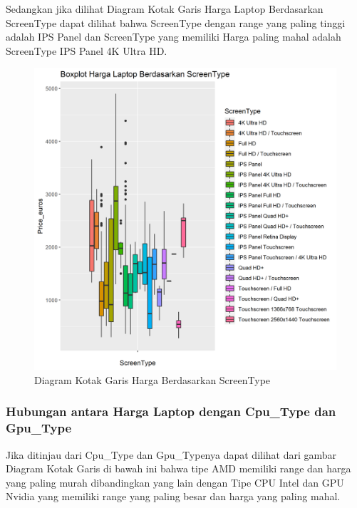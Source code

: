 \documentclass[12pt]{article}
\begin{document}
Sedangkan jika dilihat Diagram Kotak Garis Harga Laptop Berdasarkan ScreenType dapat dilihat bahwa ScreenType dengan range yang paling tinggi adalah IPS Panel dan ScreenType yang memiliki Harga paling mahal adalah ScreenType IPS Panel 4K Ultra HD.  
  
\begin{figure}[h!]
    \centering
    \includegraphics[scale = 0.4]{boxplot_price2.png}
    \caption{Diagram Kotak Garis Harga Berdasarkan ScreenType}
    \label{Resol}
\end{figure}  
  
\subsubsection{Hubungan antara Harga Laptop dengan Cpu\_Type dan Gpu\_Type}
Jika ditinjau dari Cpu\_Type dan Gpu\_Typenya dapat dilihat dari gambar Diagram Kotak Garis di bawah ini bahwa tipe AMD memiliki range dan harga yang paling murah dibandingkan yang lain dengan Tipe CPU Intel dan GPU Nvidia yang memiliki range yang paling besar dan harga yang paling mahal.   
  
\end{document}
